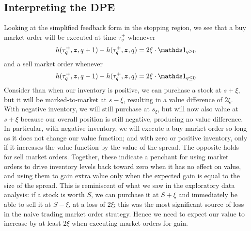 \subsection{Interpreting the DPE}

Looking at the simplified feedback form in the stopping region, we see that a buy market order will be executed at time $\tau^+_q$ whenever
\begin{equation}\label{eq:buyMOfeedbackcase1}
h(\tau^+_q, \bz, q+1) - h(\tau^+_q,\bz,q) = 2 \xi \cdot \indicator_{q \geq 0}
\end{equation}
and a sell market order whenever
\begin{equation}\label{eq:sellMOfeedbackcase1}
h(\tau^+_q, \bz, q-1) - h(\tau^+_q,\bz,q) = 2 \xi \cdot \indicator_{q \leq 0}
\end{equation}
Consider than when our inventory is positive, we can purchase a stock at $s+\xi$, but it will be marked-to-market at $s-\xi$, resulting in a value difference of $2\xi$. With negative inventory, we will still purchase at $s_\xi$, but will now also value at $s+\xi$ because our overall position is still negative, producing no value difference. In particular, with negative inventory, we will execute a buy market order so long as it does not change our value function; and with zero or positive inventory, only if it increases the value function by the value of the spread. The opposite holds for sell market orders. Together, these indicate a penchant for using market orders to drive inventory levels back toward zero when it has no effect on value, and using them to gain extra value only when the expected gain is equal to the size of the spread. This is reminiscent of what we saw in the exploratory data analysis: if a stock is worth $S$, we can purchase it at $S+\xi$ and immediately be able to sell it at $S-\xi$, at a loss of $2 \xi$; this was the most significant source of loss in the naive trading market order strategy. Hence we need to expect our value to increase by at least $2\xi$ when executing market orders for gain.

